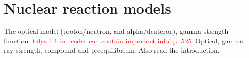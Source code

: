 \section{Nuclear reaction models}

The optical model (proton/neutron, and alpha/deuteron), gamma strength function. \textcolor{red}{talys 1.9 in reader can contain important info! p. 525}. Optical, gamma-ray strength, compound and preequilibrium. Also read the introduction. 

